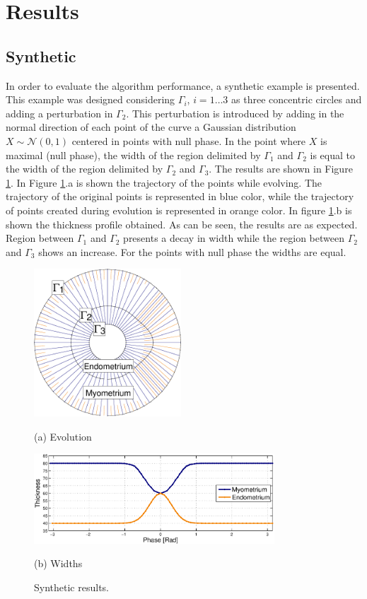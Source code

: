 \documentclass{article}
\begin{document}
\section{Results}
\label{sec:results}

\subsection{Synthetic}
\label{ssec:syn}
In order to evaluate the algorithm performance, a synthetic example is
presented. This example was designed considering $\Gamma_i$,
$i=1\dots3$ as three concentric circles and adding a perturbation in
$\Gamma_2$. This perturbation is introduced by adding in the normal
direction of each point of the curve a Gaussian distribution $X \sim
\mathcal{N}(0,1)$ centered in points with null phase. In the point
where $X$ is maximal (null phase), the width of the region delimited
by $\Gamma_1$ and $\Gamma_2$ is equal to the width of the region
delimited by $\Gamma_2$ and $\Gamma_3$. The results are shown in
Figure \ref{fig:synth}. In Figure \ref{fig:synth}.a is shown the
trajectory of the points while evolving. The trajectory of the
original points is represented in blue color, while the trajectory of
points created during evolution is represented in orange color. In
figure \ref{fig:synth}.b is shown the thickness profile obtained. As
can be seen, the results are as expected. Region between $\Gamma_1$
and $\Gamma_2$ presents a decay in width while the region between
$\Gamma_2$ and $\Gamma_3$ shows an increase. For the points with null
phase the widths are equal.
\begin{figure}[t]
  \begin{minipage}[b]{1\linewidth}
    \centering
    \centerline{\includegraphics[width=5.5cm]{pics/synth}}
    \centerline{(a) Evolution}\medskip
  \end{minipage}
  \begin{minipage}[b]{1\linewidth}
    \centering
    \centerline{\includegraphics[width=9cm]{pics/synthWidth}}
    \centerline{(b) Widths}\medskip
  \end{minipage}
  \caption{Synthetic results.}
  \label{fig:synth}
\end{figure}
\end{document}
